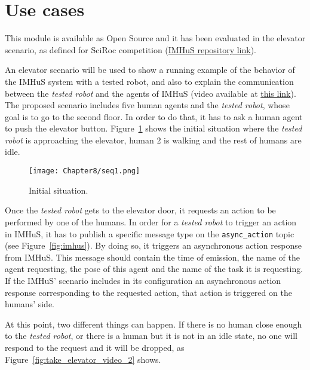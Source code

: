 \section{Use cases}
\label{sec:useCases}


This module is available as Open Source and it has been evaluated in the elevator scenario, as defined for SciRoc competition (\href{https://github.com/LAAS-HRI/IMHuS}{IMHuS repository link}). %

An elevator scenario will be used to show a running example of the behavior of the IMHuS system with a tested robot, and also to explain the communication between the \textit{tested robot} and the agents of IMHuS (video available at \href{https://github.com/LAAS-HRI/IMHuS/videos}{this link}). The proposed scenario includes five human agents and the \textit{tested robot}, whose goal is to go to the second floor. In order to do that, it has to ask a human agent to push the elevator button. Figure~\ref{fig:take_elevator_video_1} shows the initial situation where the \textit{tested robot} is approaching the elevator, human 2 is walking and the rest of humans are idle.

\begin{figure}[!ht]
  \centering
  {\texttt{[image: Chapter8/seq1.png]}}\\
  \caption{Initial situation.}
  \label{fig:take_elevator_video_1}
\end{figure}

Once the \textit{tested robot} gets to the elevator door, it requests an action to be performed by one of the humans. In order for a \textit{tested robot} to trigger an action in IMHuS, it has to publish a specific message type on the \texttt{async\_action} topic (see Figure~\ref{fig:imhus}). By doing so, it triggers an asynchronous action response from IMHuS. This message should contain the time of emission, the name of the agent requesting, the pose of this agent and the name of the task it is requesting. If the IMHuS' scenario includes in its configuration an asynchronous action response corresponding to the requested action, that action is triggered on the humans’ side.

At this point, two different things can happen. If there is no human close enough to the \textit{tested robot}, or there is a human but it is not in an idle state, no one will respond to the request and it will be dropped, as Figure~\ref{fig:take_elevator_video_2} shows.

